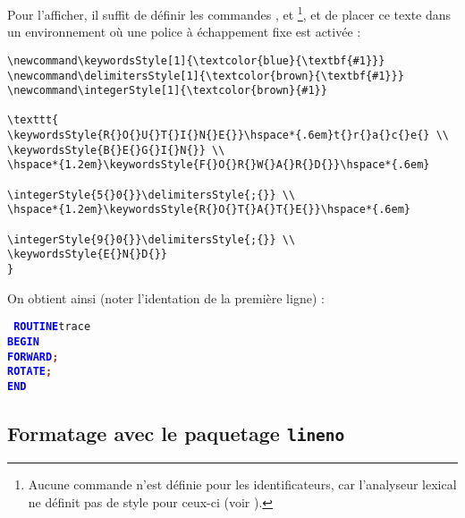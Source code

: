 Pour l'afficher, il suffit de définir les commandes ,  et \footnote{Aucune commande n'est définie pour les identificateurs, car l'analyseur lexical ne définit pas de style pour ceux-ci (voir ).}, et de placer ce texte dans un environnement où une police à échappement fixe est activée :
\begin{verbatim}
\newcommand\keywordsStyle[1]{\textcolor{blue}{\textbf{#1}}}
\newcommand\delimitersStyle[1]{\textcolor{brown}{\textbf{#1}}}
\newcommand\integerStyle[1]{\textcolor{brown}{#1}}

\texttt{
\keywordsStyle{R{}O{}U{}T{}I{}N{}E{}}\hspace*{.6em}t{}r{}a{}c{}e{} \\
\keywordsStyle{B{}E{}G{}I{}N{}} \\
\hspace*{1.2em}\keywordsStyle{F{}O{}R{}W{}A{}R{}D{}}\hspace*{.6em}
                                       \integerStyle{5{}0{}}\delimitersStyle{;{}} \\
\hspace*{1.2em}\keywordsStyle{R{}O{}T{}A{}T{}E{}}\hspace*{.6em}
                                       \integerStyle{9{}0{}}\delimitersStyle{;{}} \\
\keywordsStyle{E{}N{}D{}}
}
\end{verbatim}

On obtient ainsi (noter l'identation de la première ligne) :

\texttt{
\textcolor{blue}{\bf ROUTINE}\hspace*{.6em}t{}r{}a{}c{}e{} \\
\textcolor{blue}{\bf BEGIN} \\
\hspace*{1.2em}\textcolor{blue}{\bf FORWARD}\hspace*{.6em}\textcolor{brown}{\bf ;} \\
\hspace*{1.2em}\textcolor{blue}{\bf ROTATE}\hspace*{.6em}\textcolor{brown}{\bf ;} \\
\textcolor{blue}{\bf END}
}

\subsection{Formatage avec le paquetage \texttt{lineno}}

